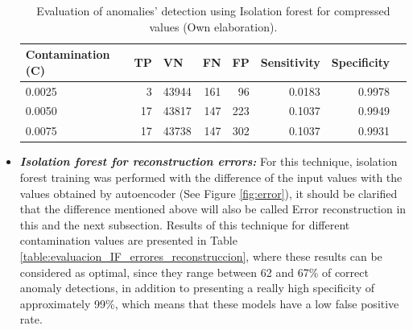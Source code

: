 \begin{itemize}
\begin{table}[H]
\centering
\begin{center}
\begin{tabular}{|l|r|r|r|r|r|r|r|}
\hline
\textbf{Contamination (C)} & \multicolumn{1}{l|}{\textbf{TP}} & \multicolumn{1}{l|}{\textbf{VN}}& \multicolumn{1}{l|}{\textbf{FN}}& \multicolumn{1}{l|}{\textbf{FP}} & \multicolumn{1}{l|}{\textbf{Sensitivity}} & \multicolumn{1}{l|}{\textbf{Specificity}} \\ \hline
0.0025 & \cellcolor[HTML]{AADD99} 3 & \cellcolor[HTML]{AADD99} 43944 & \cellcolor[HTML]{FFCE93} 161 & \cellcolor[HTML]{FFCE93} 96 & 0.0183 & 0.9978 \\ \hline
0.0050 & \cellcolor[HTML]{AADD99} 17 & \cellcolor[HTML]{AADD99} 43817 & \cellcolor[HTML]{FFCE93} 147 & \cellcolor[HTML]{FFCE93} 223 & 0.1037 & 0.9949 \\ \hline
0.0075 & \cellcolor[HTML]{AADD99} 17 & \cellcolor[HTML]{AADD99} 43738 & \cellcolor[HTML]{FFCE93} 147 & \cellcolor[HTML]{FFCE93} 302 & 0.1037 & 0.9931 \\ \hline
\end{tabular}
\end{center}
\caption{Evaluation of anomalies' detection using Isolation forest for compressed values (Own elaboration).}
\label{table:evaluacion_IF_encoded}
\end{table}

\item \textbf{\textit{Isolation forest for reconstruction errors: }}For this technique, isolation forest training was performed with the difference of the input values with the values obtained by autoencoder (See Figure \ref{fig:error}), it should be clarified that the difference mentioned above will also be called Error reconstruction in this and the next subsection. Results of this technique for different contamination values are presented in Table \ref{table:evaluacion_IF_errores_reconstruccion}, where these results can be considered as optimal, since they range between 62 and 67\% of correct anomaly detections, in addition to presenting a really high specificity of approximately 99\%, which means that these models have a low false positive rate.


\end{itemize}
